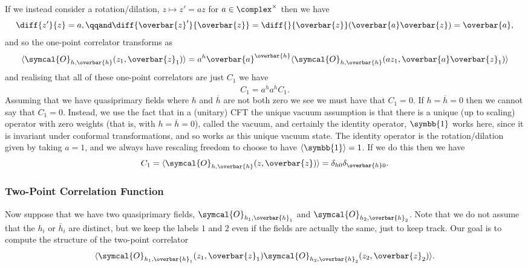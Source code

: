 \documentclass[fleqn]{NotesClass}
\newcommand{\quantumField}[1]{\symcal{#1}}
\DeclarePairedDelimiter{\correlator}{\langle}{\rangle}
\newcommand{\identity}{\symbb{1}}
\begin{document}
    If we instead consider a rotation/dilation, \(z \mapsto z' = az\) for \(a \in \complex^{\times}\) then we have
    \begin{equation}
        \diff{z'}{z} = a, \qqand \diff{\overbar{z}'}{\overbar{z}} = \diff{}{\overbar{z}} (\overbar{a} \overbar{z}) = \overbar{a},
    \end{equation}
    and so the one-point correlator transforms as
    \begin{equation}
        \correlator{\quantumField{O}_{h,\overbar{h}}(z_1, \overbar{z}_1)} = a^h \overbar{a}^{\overbar{h}} \correlator{\quantumField{O}_{h,\overbar{h}}(az_1, \overbar{a}\overbar{z}_1)}
    \end{equation}
    and realising that all of these one-point correlators are just \(C_1\) we have
    \begin{equation}
        C_1 = a^h a^{\overbar{h}}C_1.
    \end{equation}
    Assuming that we have quasiprimary fields where \(h\) and \(\overbar{h}\) are not both zero we see we must have that \(C_1 = 0\).
    If \(h = \overbar{h} = 0\) then we cannot say that \(C_1 = 0\).
    Instead, we use the fact that in a (unitary) CFT the unique vacuum assumption is that there is a unique (up to scaling) operator with zero weights (that is, with \(h = \overbar{h} = 0\)), called the vacuum, and certainly the identity operator, \(\identity\) works here, since it is invariant under conformal transformations, and so works as this unique vacuum state.
    The identity operator is the rotation/dilation given by taking \(a = 1\), and we always have rescaling freedom to choose to have \(\correlator{\identity} = 1\).
    If we do this then we have
    \begin{equation}
        C_1 = \correlator{\quantumField{O}_{h,\overbar{h}}(z, \overbar{z})} = \delta_{h0} \delta_{\overbar{h}0}.
    \end{equation}
    
    \subsubsection{Two-Point Correlation Function}
    Now suppose that we have two quasiprimary fields, \(\quantumField{O}_{h_1,\overbar{h}_1}\) and \(\quantumField{O}_{h_2,\overbar{h}_2}\).
    Note that we do not assume that the \(h_i\) or \(\overbar{h}_i\) are distinct, but we keep the labels \(1\) and \(2\) even if the fields are actually the same, just to keep track.
    Our goal is to compute the structure of the two-point correlator
    \begin{equation}
        \correlator{\quantumField{O}_{h_1,\overbar{h}_1}(z_1, \overbar{z}_1) \quantumField{O}_{h_2, \overbar{h}_2}(z_2, \overbar{z}_2)}.
    \end{equation}
    
\end{document}
